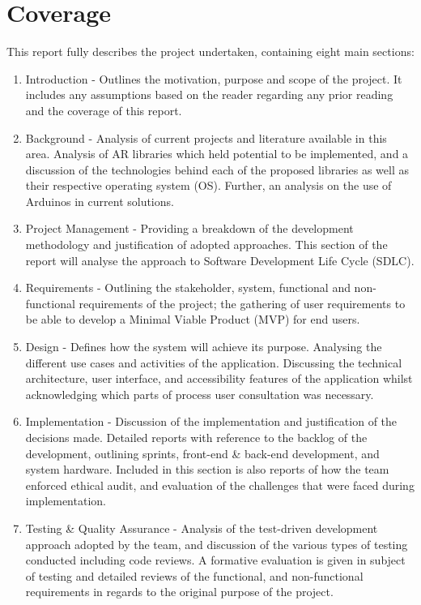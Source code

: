 \section{Coverage}
This report fully describes the project undertaken, containing eight main sections:

\begin{enumerate}
	\item Introduction - Outlines the motivation, purpose and scope of the project. It includes any assumptions based on the reader regarding any prior reading and the coverage of this report.

	\item Background - Analysis of current projects and literature available in this area. Analysis of AR libraries which held potential to be implemented, and a discussion of the technologies behind each of the proposed libraries as well as their respective operating system (OS). Further, an analysis on the use of Arduinos in current solutions.

	\item Project Management - Providing a breakdown of the development methodology and justification of adopted approaches. This section of the report will analyse the approach to Software Development Life Cycle (SDLC).

	\item Requirements - Outlining the stakeholder, system, functional and non-functional requirements of the project; the gathering of user requirements to be able to develop a Minimal Viable Product (MVP) for end users. 

	\item Design - Defines how the system will achieve its purpose. Analysing the different use cases and activities of the application. Discussing the technical architecture, user interface, and accessibility features of the application whilst acknowledging which parts of process user consultation was necessary.

	\item Implementation - Discussion of the implementation and justification of the decisions made. Detailed reports with reference to the backlog of the development, outlining sprints, front-end \& back-end development, and system hardware. Included in this section is also reports of how the team enforced ethical audit, and evaluation of the challenges that were faced during implementation.

	\item Testing \& Quality Assurance - Analysis of the test-driven development approach adopted by the team, and discussion of the various types of testing conducted including code reviews. A formative evaluation is given in subject of testing and detailed reviews of the functional, and non-functional requirements in regards to the original purpose of the project.


\end{enumerate}
